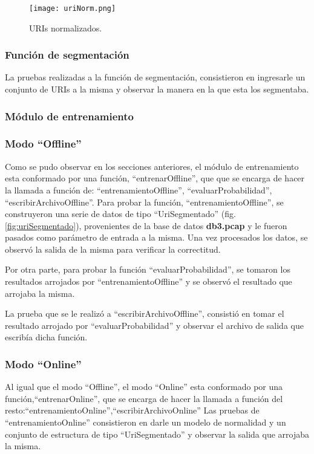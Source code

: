 \begin{figure}[tb]
\begin{center}
\texttt{[image: uriNorm.png]}
\caption{URIs normalizados.}
\label{fig:uriNorm}
\end{center}
\end{figure}

\subsubsection*{Función de segmentación}

La pruebas realizadas a la función de segmentación, consistieron en ingresarle un conjunto de URIs a la misma y observar la manera en la que
esta los segmentaba.

\subsubsection{Módulo de entrenamiento}
\subsubsection*{Modo ``Offline''}
Como se pudo observar en los secciones anteriores, el módulo de entrenamiento esta conformado por una función, ``entrenarOffline'', que que se
encarga de hacer la llamada a función de: ``entrenamientoOffline'', ``evaluarProbabilidad'', ``escribirArchivoOffline''.
Para probar la función, ``entrenamientoOffline'', se construyeron una serie de datos de tipo ``UriSegmentado'' (fig. \ref{fig:uriSegmentado}), provenientes de la base de datos \textbf{db3.pcap} y le fueron pasados como parámetro de entrada a la misma. Una vez procesados los datos, se observó la salida de la misma para verificar la correctitud.

Por otra parte, para probar la función ``evaluarProbabilidad'', se tomaron los resultados arrojados por ``entrenamientoOffline'' y se
observó el resultado que arrojaba la misma. 

La prueba que se le realizó a ``escribirArchivoOffline'', consistió en tomar el resultado arrojado por ``evaluarProbabilidad'' y observar el
archivo de salida que escribía dicha función. 

\subsubsection*{Modo ``Online''}
Al igual que el modo ``Offline'', el modo ``Online'' esta conformado por
una función,``entrenarOnline'', que se encarga de hacer la llamada a función
del resto:``entrenamientoOnline'',``escribirArchivoOnline''
Las pruebas de ``entrenamientoOnline'' consistieron en darle un modelo de normalidad y un conjunto de estructura
de tipo ``UriSegmentado'' y observar la salida que arrojaba la misma.

